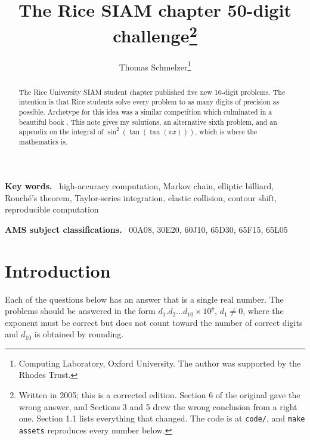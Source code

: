\documentclass[11pt]{article}
\title{The Rice SIAM chapter 50-digit challenge\thanks{Written in 2005;
this is a corrected edition. Section 6 of the original gave the wrong
answer, and Sections 3 and 5 drew the wrong conclusion from a right one.
Section 1.1 lists everything that changed. The code is at
\texttt{code/}, and \texttt{make assets} reproduces every number below.}}
\author{Thomas Schmelzer\thanks{Computing Laboratory, Oxford University.
The author was supported by the Rhodes Trust.}}
\date{}
\newenvironment{keywords}
  {\par\medskip\noindent\small\textbf{Key words.}\ \ignorespaces}
  {\par}
\newenvironment{AMS}
  {\par\smallskip\noindent\small\textbf{AMS subject classifications.}\ %
   \ignorespaces}
  {\par\medskip}
\begin{document}
\maketitle

\begin{abstract}
The Rice University SIAM student chapter published five new 10-digit
problems. The intention is that Rice students solve every problem to as many
digits of precision as possible. Archetype for this idea was a similar
competition which culminated in a beautiful book \cite{bornemann}. This note
gives my solutions, an alternative sixth problem, and an appendix on the
integral of $\sin^2(\tan(\tan(\pi x)))$, which is where the mathematics is.
\end{abstract}

\begin{keywords}
high-accuracy computation, Markov chain, elliptic billiard, Rouch\'e's
theorem, Taylor-series integration, elastic collision, contour shift,
reproducible computation
\end{keywords}

\begin{AMS}
00A08, 30E20, 60J10, 65D30, 65F15, 65L05
\end{AMS}

\section{Introduction}
Each of the questions below has an answer that is a single real number. The
problems should be answered in the form $d_1.d_2\ldots d_{10}\times 10^p$,
$d_1 \neq 0$, where the exponent must be correct but does not count toward
the number of correct digits and $d_{10}$ is obtained by rounding.
\end{document}
